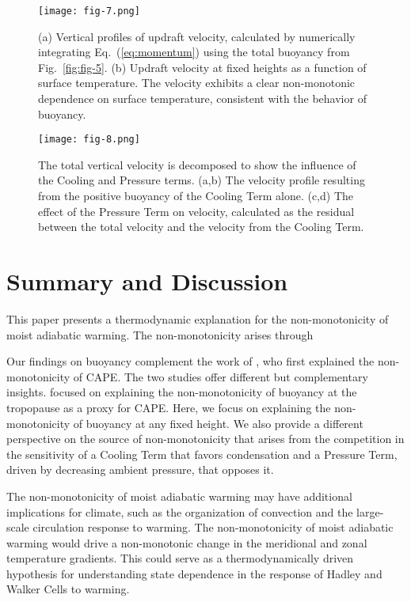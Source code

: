 \documentclass[draft]{ametsocV6.1}
\begin{document}
\begin{figure}[htbp]
 \centering
 \texttt{[image: fig-7.png]}\\
 \caption{(a) Vertical profiles of updraft velocity, calculated by numerically integrating Eq.~(\ref{eq:momentum}) using the total buoyancy from Fig.~\ref{fig:fig-5}. (b) Updraft velocity at fixed heights as a function of surface temperature. The velocity exhibits a clear non-monotonic dependence on surface temperature, consistent with the behavior of buoyancy.}\label{fig:fig-7}
\end{figure}

\clearpage

\begin{figure}[htbp]
 \centering
 \texttt{[image: fig-8.png]}\\
 \caption{The total vertical velocity is decomposed to show the influence of the Cooling and Pressure terms. (a,b) The velocity profile resulting from the positive buoyancy of the Cooling Term alone. (c,d) The effect of the Pressure Term on velocity, calculated as the residual between the total velocity and the velocity from the Cooling Term.}\label{fig:fig-8}
\end{figure}


\section{Summary and Discussion}

This paper presents a thermodynamic explanation for the non-monotonicity of moist adiabatic warming. The non-monotonicity arises through 

Our findings on buoyancy complement the work of \cite{romps2016}, who first explained the non-monotonicity of CAPE. The two studies offer different but complementary insights. \cite{romps2016} focused on explaining the non-monotonicity of buoyancy at the tropopause as a proxy for CAPE. Here, we focus on explaining the non-monotonicity of buoyancy at any fixed height. We also provide a different perspective on the source of non-monotonicity that arises from the competition in the sensitivity of a Cooling Term that favors condensation and a Pressure Term, driven by decreasing ambient pressure, that opposes it.

The non-monotonicity of moist adiabatic warming may have additional implications for climate, such as the organization of convection and the large-scale circulation response to warming. The non-monotonicity of moist adiabatic warming would drive a non-monotonic change in the meridional and zonal temperature gradients. This could serve as a thermodynamically driven hypothesis for understanding state dependence in the response of Hadley and Walker Cells to warming.
\end{document}
